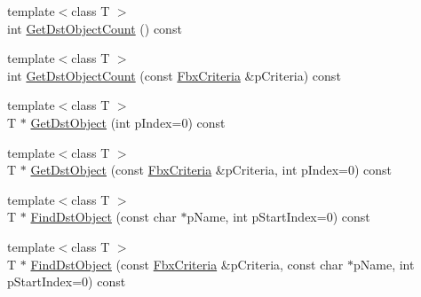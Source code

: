 \begin{Indent}
\begin{DoxyCompactItemize}
\item 
{\footnotesize template$<$class T $>$ }\\int \hyperlink{class_fbx_object_a1a642124ddabd14884fc0c85793a5c6d}{Get\+Dst\+Object\+Count} () const
\item 
{\footnotesize template$<$class T $>$ }\\int \hyperlink{class_fbx_object_a03da9b6768a234550042e0b3a70f081f}{Get\+Dst\+Object\+Count} (const \hyperlink{class_fbx_criteria}{Fbx\+Criteria} \&p\+Criteria) const
\item 
{\footnotesize template$<$class T $>$ }\\T $\ast$ \hyperlink{class_fbx_object_a07c0fb98b3aba9a646f5bbf849c0e6da}{Get\+Dst\+Object} (int p\+Index=0) const
\item 
{\footnotesize template$<$class T $>$ }\\T $\ast$ \hyperlink{class_fbx_object_a4482176c100b07f3c4d7a0f20f2b04ff}{Get\+Dst\+Object} (const \hyperlink{class_fbx_criteria}{Fbx\+Criteria} \&p\+Criteria, int p\+Index=0) const
\item 
{\footnotesize template$<$class T $>$ }\\T $\ast$ \hyperlink{class_fbx_object_a4a768949e619922b90d4a87ae3800cf5}{Find\+Dst\+Object} (const char $\ast$p\+Name, int p\+Start\+Index=0) const
\item 
{\footnotesize template$<$class T $>$ }\\T $\ast$ \hyperlink{class_fbx_object_a3b306a938291cb57f964bdfebaf503e7}{Find\+Dst\+Object} (const \hyperlink{class_fbx_criteria}{Fbx\+Criteria} \&p\+Criteria, const char $\ast$p\+Name, int p\+Start\+Index=0) const
\end{DoxyCompactItemize}
\end{Indent}

